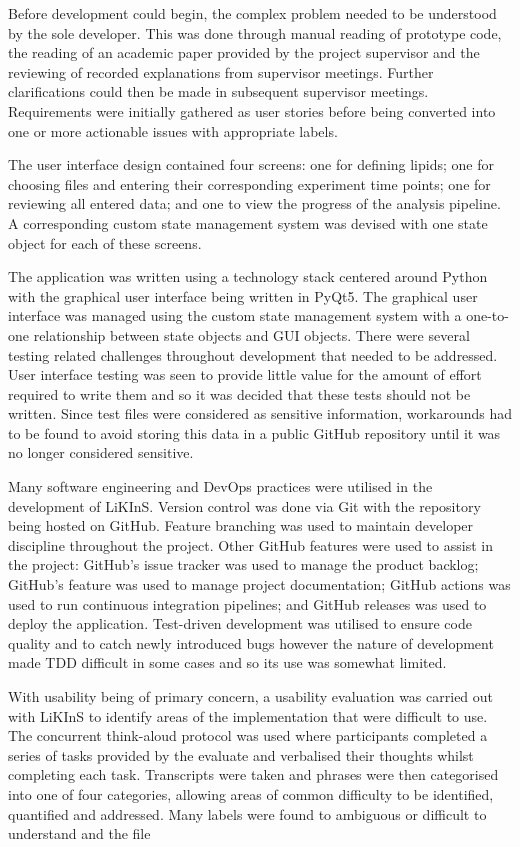 \documentclass{l4proj}
\begin{document}
Before development could begin, the complex problem needed to be understood by the sole developer. This was done through manual reading of prototype code, the reading of an academic paper provided by the project supervisor and the reviewing of recorded explanations from supervisor meetings. Further clarifications could then be made in subsequent supervisor meetings. Requirements were initially gathered as user stories before being converted into one or more actionable issues with appropriate labels.

The user interface design contained four screens: one for defining lipids; one for choosing files and entering their corresponding experiment time points; one for reviewing all entered data; and one to view the progress of the analysis pipeline. A corresponding custom state management system was devised with one state object for each of these screens. 

The application was written using a technology stack centered around Python with the graphical user interface being written in PyQt5. The graphical user interface was managed using the custom state management system with a one-to-one relationship between state objects and GUI objects. There were several testing related challenges throughout development that needed to be addressed. User interface testing was seen to provide little value for the amount of effort required to write them and so it was decided that these tests should not be written. Since test files were considered as sensitive information, workarounds had to be found to avoid storing this data in a public GitHub repository until it was no longer considered sensitive.

Many software engineering and DevOps practices were utilised in the development of LiKInS. Version control was done via Git with the repository being hosted on GitHub. Feature branching was used to maintain developer discipline throughout the project. Other GitHub features were used to assist in the project: GitHub's issue tracker was used to manage the product backlog; GitHub's  feature was used to manage project documentation; GitHub actions was used to run continuous integration pipelines; and GitHub releases was used to deploy the application. Test-driven development was utilised to ensure code quality and to catch newly introduced bugs however the nature of development made TDD difficult in some cases and so its use was somewhat limited.

With usability being of primary concern, a usability evaluation was carried out with LiKInS to identify areas of the implementation that were difficult to use. The concurrent think-aloud protocol was used where participants completed a series of tasks provided by the evaluate and verbalised their thoughts whilst completing each task. Transcripts were taken and phrases were then categorised into one of four categories, allowing areas of common difficulty to be identified, quantified and addressed. Many labels were found to ambiguous or difficult to understand and the file 
\end{document}
